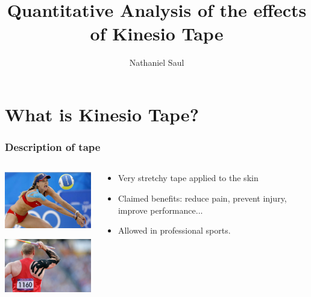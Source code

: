 \documentclass{beamer} %
\title{Quantitative Analysis of the effects of Kinesio Tape}
\author{Nathaniel Saul}
\institute{University of Hawaii at Manoa}
\theoremstyle{definition} %
\begin{document}
\begin{frame} 
\titlepage
\end{frame}

\section{What is Kinesio Tape?} %

\begin{frame} 
\frametitle{Description of tape}


\begin{columns} %

\begin{column}{0.5\textwidth} %
\includegraphics[width=5cm]{../images/kerri_walsh_kinesio.jpg} %

\includegraphics[width=5cm]{../images/olympic-javelin-kinesio-tape.jpg} 
\end{column}

\begin{column}{0.5\textwidth} %
\begin{itemize}
	\item Very stretchy tape applied to the skin
	\item Claimed benefits: \pause reduce pain, \pause prevent injury, \pause improve performance...
	\pause
	\item Allowed in professional sports.  
\end{itemize}
\end{column}


\end{columns}




\end{frame}
\end{document}
